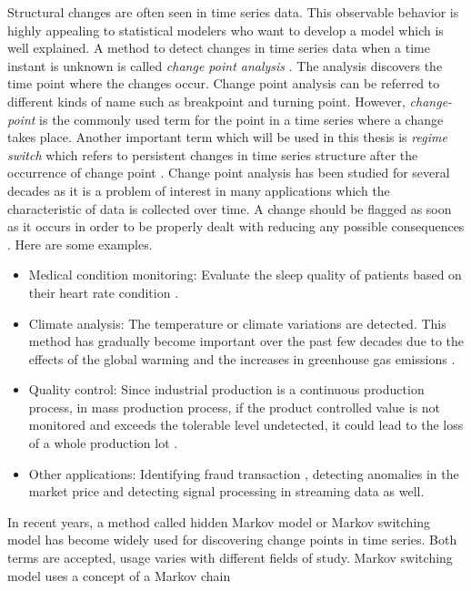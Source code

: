 Structural changes are often seen in time series data. This observable
behavior is highly appealing to statistical modelers who want to develop
a model which is well explained. A method to detect changes in time
series data when a time instant is unknown is called \emph{change
point analysis} \citep{basseville1993detection}. The analysis discovers
the time point where the changes occur. Change point analysis can
be referred to different kinds of name such as breakpoint and turning
point. However, \emph{change-point} is the commonly used term for
the point in a time series where a change takes place. Another important
term which will be used in this thesis is \emph{regime switch} which
refers to persistent changes in time series structure after the occurrence
of change point \citep{weskamp2010change}. Change point analysis
has been studied for several decades as it is a problem of interest
in many applications which the characteristic of data is collected
over time. A change should be flagged as soon as it occurs in order
to be properly dealt with reducing any possible consequences \citep{sharkey2014nonparametric}.
Here are some examples.
\begin{itemize}
\item Medical condition monitoring: Evaluate the sleep quality of patients
based on their heart rate condition \citep{staudacher2005new}. 
\item Climate analysis: The temperature or climate variations are detected.
This method has gradually become important over the past few decades
due to the effects of the global warming and the increases in greenhouse
gas emissions \citep{reeves2007review,beaulieu2012change}. 
\item Quality control: Since industrial production is a continuous production
process, in mass production process, if the product controlled value
is not monitored and exceeds the tolerable level undetected, it could
lead to the loss of a whole production lot \citep{page1954continuous}. 
\item Other applications: Identifying fraud transaction \citep{bolton2002statistical},
detecting anomalies in the market price \citep{gu2013fast} and detecting
signal processing \citep{basseville1993detection} in streaming data
as well. 
\end{itemize}
In recent years, a method called hidden Markov model or Markov switching
model has become widely used for discovering change points in time
series. Both terms are accepted, usage varies with different fields
of study. Markov switching model uses a concept of a Markov chain
